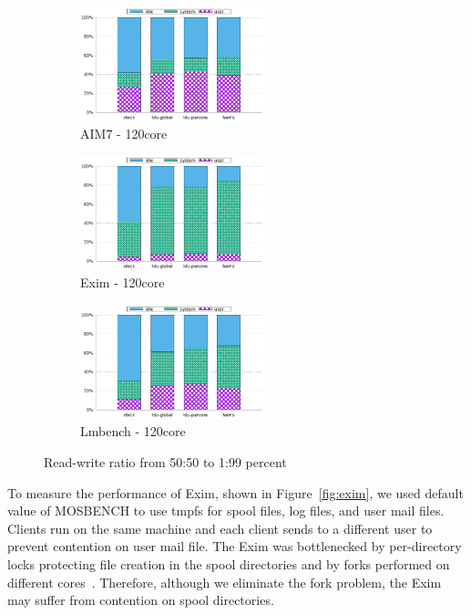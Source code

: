 \begin{figure}[t!]
    \centering
    \begin{subfigure}[b]{0.33\textwidth}
        \includegraphics[height=1.3in]{graph/aim7_cpuutils.eps}
        \caption{AIM7 - 120core}
    \end{subfigure}%
    \begin{subfigure}[b]{0.33\textwidth}
        \includegraphics[height=1.3in]{graph/exim_cpuutils.eps}
        \caption{Exim - 120core}
    \end{subfigure}
    \begin{subfigure}[b]{0.33\textwidth}
        \includegraphics[height=1.3in]{graph/lmbench_cpuutils.eps}
        \caption{Lmbench - 120core}
    \end{subfigure}
        \centering
    \caption{Read-write ratio from 50:50 to 1:99 percent}
    
\end{figure}



\ifkor
To measure the performance of Exim, shown in Figure~\ref{fig:exim}, we
used default value of MOSBENCH to use tmpfs for
spool files, log files, and user mail files.
Clients run on the same machine and each client sends to a different user to
prevent contention on user mail file.
The Exim was bottlenecked by per-directory locks protecting file creation in
the spool directories and by forks performed on different
cores~\cite{SilasBoydWickizer2010LinuxScales48}.
Therefore, although we eliminate the fork problem, the Exim may suffer from
contention on spool directories. 
\else
\fi

